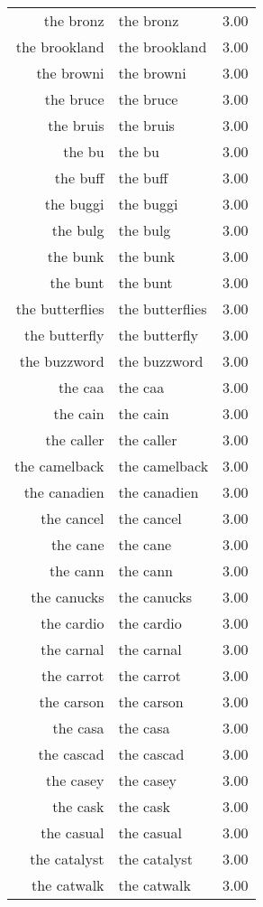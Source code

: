 \begin{table}[ht]
\begin{tabular}{rlr}
  the bronz & the bronz & 3.00 \\ 
  the brookland & the brookland & 3.00 \\ 
  the browni & the browni & 3.00 \\ 
  the bruce & the bruce & 3.00 \\ 
  the bruis & the bruis & 3.00 \\ 
  the bu & the bu & 3.00 \\ 
  the buff & the buff & 3.00 \\ 
  the buggi & the buggi & 3.00 \\ 
  the bulg & the bulg & 3.00 \\ 
  the bunk & the bunk & 3.00 \\ 
  the bunt & the bunt & 3.00 \\ 
  the butterflies & the butterflies & 3.00 \\ 
  the butterfly & the butterfly & 3.00 \\ 
  the buzzword & the buzzword & 3.00 \\ 
  the caa & the caa & 3.00 \\ 
  the cain & the cain & 3.00 \\ 
  the caller & the caller & 3.00 \\ 
  the camelback & the camelback & 3.00 \\ 
  the canadien & the canadien & 3.00 \\ 
  the cancel & the cancel & 3.00 \\ 
  the cane & the cane & 3.00 \\ 
  the cann & the cann & 3.00 \\ 
  the canucks & the canucks & 3.00 \\ 
  the cardio & the cardio & 3.00 \\ 
  the carnal & the carnal & 3.00 \\ 
  the carrot & the carrot & 3.00 \\ 
  the carson & the carson & 3.00 \\ 
  the casa & the casa & 3.00 \\ 
  the cascad & the cascad & 3.00 \\ 
  the casey & the casey & 3.00 \\ 
  the cask & the cask & 3.00 \\ 
  the casual & the casual & 3.00 \\ 
  the catalyst & the catalyst & 3.00 \\ 
  the catwalk & the catwalk & 3.00 \\ 

\end{tabular}
\end{table}
